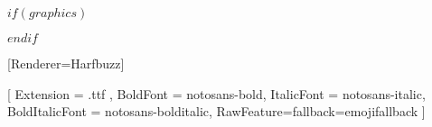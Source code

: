 $if(graphics)$
\usepackage{graphicx}
\makeatletter
\newsavebox\pandoc@box
\newcommand*\pandocbounded[1]{%
  \sbox\pandoc@box{#1}%
  \Gscale@div\@tempa{\textheight}{\dimexpr\ht\pandoc@box+\dp\pandoc@box\relax}%
  \Gscale@div\@tempb{\linewidth}{\wd\pandoc@box}%
  \ifdim\@tempb\p@<\@tempa\p@\let\@tempa\@tempb\fi%
  \ifdim\@tempa\p@<\p@\scalebox{\@tempa}{\usebox\pandoc@box}%
  \else\usebox{\pandoc@box}%
  \fi%
}
\def\fps@figure{htbp}
\makeatother
$endif$

\usepackage[section]{placeins}


\usepackage{emoji}
\usepackage{fontspec}
[Renderer=Harfbuzz]



\setmainfont{notosans-regular}[
  Extension      = .ttf ,
  BoldFont       = notosans-bold,
  ItalicFont     = notosans-italic,
  BoldItalicFont = notosans-bolditalic,
  RawFeature={fallback=emojifallback}
]



